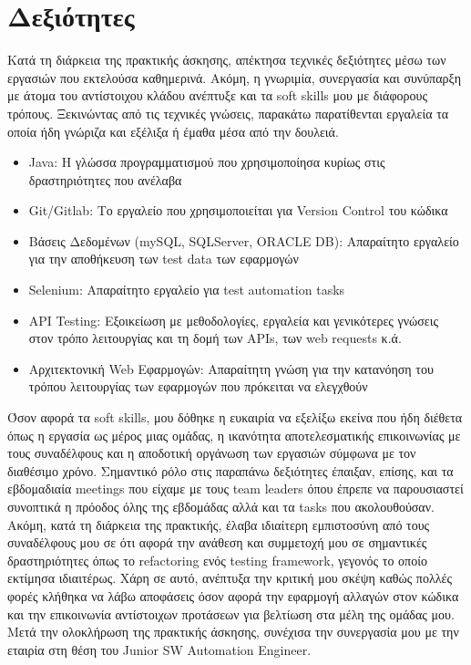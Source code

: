 \section{Δεξιότητες}
Κατά τη διάρκεια της πρακτικής άσκησης, απέκτησα τεχνικές δεξιότητες μέσω των εργασιών που εκτελούσα καθημερινά. Ακόμη, η γνωριμία, συνεργασία και συνύπαρξη με άτομα του αντίστοιχου κλάδου ανέπτυξε και τα 
soft skills μου με διάφορους τρόπους. Ξεκινώντας από τις τεχνικές γνώσεις, παρακάτω παρατίθενται εργαλεία τα οποία ήδη γνώριζα και εξέλιξα ή έμαθα μέσα από την δουλειά.
\begin{itemize}
    \item Java: Η γλώσσα προγραμματισμού που χρησιμοποίησα κυρίως στις δραστηριότητες που ανέλαβα
    \item Git/Gitlab: Το εργαλείο που χρησιμοποιείται για Version Control του κώδικα
    \item Βάσεις Δεδομένων (mySQL, SQLServer, ORACLE DB): Απαραίτητο εργαλείο για την αποθήκευση των test data των εφαρμογών
    \item Selenium: Απαραίτητο εργαλείο για test automation tasks
    \item API Testing: Εξοικείωση με μεθοδολογίες, εργαλεία και γενικότερες γνώσεις στον τρόπο λειτουργίας και τη δομή των APIs, των web requests κ.ά.
    \item Αρχιτεκτονική Web Εφαρμογών: Απαραίτητη γνώση για την κατανόηση του τρόπου λειτουργίας των εφαρμογών που πρόκειται να ελεγχθούν
\end{itemize}

Όσον αφορά τα soft skills, μου δόθηκε η ευκαιρία να εξελίξω εκείνα που ήδη διέθετα όπως η εργασία ως μέρος μιας ομάδας, η ικανότητα αποτελεσματικής επικοινωνίας με τους συναδέλφους και 
η αποδοτική οργάνωση των εργασιών σύμφωνα με τον διαθέσιμο χρόνο. Σημαντικό ρόλο στις παραπάνω δεξιότητες έπαιξαν, επίσης, και τα εβδομαδιαία meetings που είχαμε με τους team leaders όπου έπρεπε να παρουσιαστεί 
συνοπτικά η πρόοδος όλης της εβδομάδας αλλά και τα tasks που ακολουθούσαν. Ακόμη, κατά τη διάρκεια της πρακτικής, έλαβα ιδιαίτερη εμπιστοσύνη από τους συναδέλφους μου σε ότι αφορά την ανάθεση και συμμετοχή μου σε 
σημαντικές δραστηριότητες όπως το refactoring ενός testing framework, γεγονός το οποίο εκτίμησα ιδιαιτέρως. Χάρη σε αυτό, ανέπτυξα την κριτική μου σκέψη καθώς πολλές φορές κλήθηκα να λάβω αποφάσεις  
όσον αφορά την εφαρμογή αλλαγών στον κώδικα και την επικοινωνία αντίστοιχων προτάσεων για βελτίωση στα μέλη της ομάδας μου.\\

Μετά την ολοκλήρωση της πρακτικής άσκησης, συνέχισα την συνεργασία μου με την εταιρία στη θέση του Junior SW Automation Engineer.
